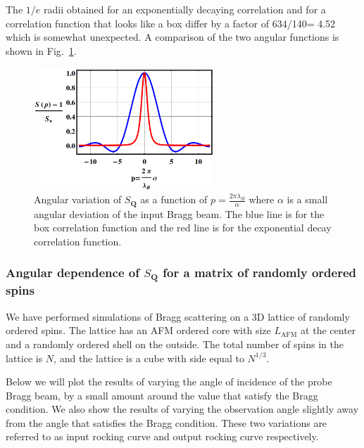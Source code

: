 \documentclass[11pt,letter]{article}
\newcommand{\bv}[1]{\ensuremath{\bm{#1}}}
\begin{document}
The $1/e$ radii obtained for an exponentially decaying correlation and for a
correlation function that looks like a box differ by a factor of 634/140= 4.52
which is somewhat unexpected. A comparison of
the two angular functions is shown in Fig.~\ref{fig:salpha-fourier}. 
\begin{figure}
\centering
\includegraphics[width=0.6\textwidth]{figures_140308/rocking-fourier.png}
\caption[Angular variation of $S_{\bv{Q}}$]{\small Angular variation of
$S_{\bv{Q}}$ as a function of $p=\frac{2\pi\lambda_{B}}{\alpha}$  where
$\alpha$ is a small angular deviation of the input Bragg beam.  The blue line
is for the box correlation function and the red line is for the exponential
decay correlation function. }
\label{fig:salpha-fourier}
\end{figure}


 

\subsubsection{Angular dependence of $S_{\bv{Q}}$ for a matrix of randomly
ordered spins}

We have performed simulations of Bragg scattering on  a 3D lattice of randomly
ordered spins.  The lattice has an AFM ordered core with size $L_{\text{AFM}}$
at the center  and a randomly ordered shell on the outside.  The total number
of spins in the lattice is $N$, and the lattice is a cube with side equal to
$N^{1/3}$.

Below we will plot the results of varying the angle of incidence of the probe Bragg
beam, by a small amount around the value that satisfy the Bragg condition.   We
also show the results of varying the observation angle slightly away from the
angle that satisfies the Bragg condition.   These two variations are referred
to as input rocking curve and output rocking curve respectively. 
\end{document}
